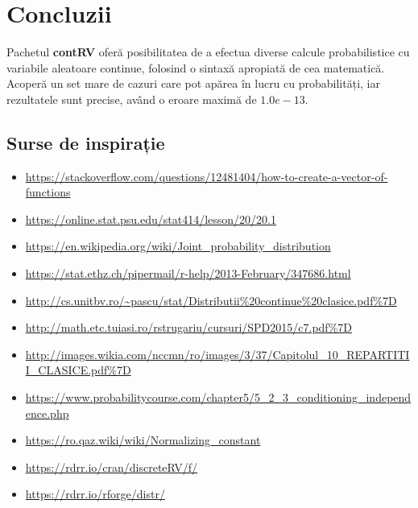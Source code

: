\documentclass[12pt]{article}
\begin{document}
\section{Concluzii} \hfill
\par Pachetul \textbf{contRV} oferă posibilitatea de a efectua diverse calcule probabilistice cu variabile aleatoare continue, folosind o sintaxă apropiată de cea matematică. Acoperă un set mare de cazuri care pot apărea în lucru cu probabilități, iar rezultatele sunt precise, având o eroare maximă de $1.0e-13$.
\subsection{Surse de inspirație}
\begin{itemize}
	\item \url{https://stackoverflow.com/questions/12481404/how-to-create-a-vector-of-functions}
	\item \url{https://online.stat.psu.edu/stat414/lesson/20/20.1}
	\item \url{https://en.wikipedia.org/wiki/Joint_probability_distribution}
	\item \url{https://stat.ethz.ch/pipermail/r-help/2013-February/347686.html}
	\item \url{http://cs.unitbv.ro/~pascu/stat/Distributii%20continue%20clasice.pdf%7D}
	\item \url{http://math.etc.tuiasi.ro/rstrugariu/cursuri/SPD2015/c7.pdf%7D}
	\item \url{http://images.wikia.com/nccmn/ro/images/3/37/Capitolul_10_REPARTITII_CLASICE.pdf%7D}
	\item \url{https://www.probabilitycourse.com/chapter5/5_2_3_conditioning_independence.php}
	\item \url{https://ro.qaz.wiki/wiki/Normalizing_constant}
	\item \url{https://rdrr.io/cran/discreteRV/f/}
	\item \url{https://rdrr.io/rforge/distr/}
\end{itemize}
\end{document}
